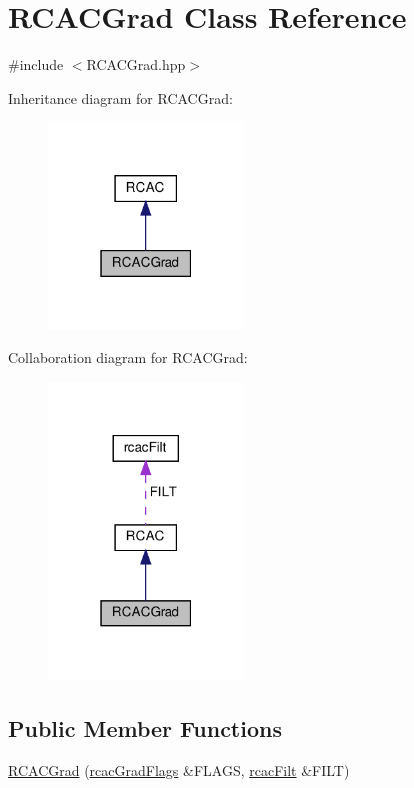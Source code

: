 \hypertarget{class_r_c_a_c_grad}{}\section{R\+C\+A\+C\+Grad Class Reference}
\label{class_r_c_a_c_grad}


{\ttfamily \#include $<$R\+C\+A\+C\+Grad.\+hpp$>$}



Inheritance diagram for R\+C\+A\+C\+Grad\+:
\nopagebreak
\begin{figure}[H]
\begin{center}
\leavevmode
\includegraphics[width=147pt]{class_r_c_a_c_grad__inherit__graph}
\end{center}
\end{figure}


Collaboration diagram for R\+C\+A\+C\+Grad\+:
\nopagebreak
\begin{figure}[H]
\begin{center}
\leavevmode
\includegraphics[width=147pt]{class_r_c_a_c_grad__coll__graph}
\end{center}
\end{figure}
\subsection*{Public Member Functions}
\begin{DoxyCompactItemize}
\item 
\hyperlink{class_r_c_a_c_grad_a62f433bc3efdfc5133105c5b2fd59ea6}{R\+C\+A\+C\+Grad} (\hyperlink{structrcac_grad_flags}{rcac\+Grad\+Flags} \&F\+L\+A\+GS, \hyperlink{structrcac_filt}{rcac\+Filt} \&F\+I\+LT)
\end{DoxyCompactItemize}
